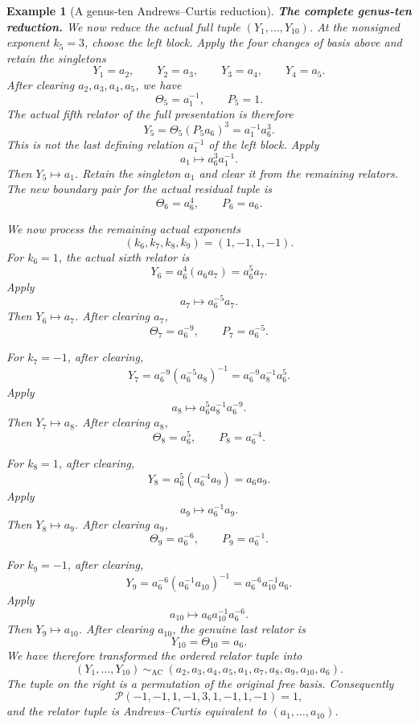 \documentclass{article}
\newtheorem{example}[theorem]{Example}
\begin{document}
\begin{example}[A genus-ten Andrews--Curtis reduction]
\medskip
\noindent\textbf{The complete genus-ten reduction.}
We now reduce the actual full tuple $(Y_1,\ldots,Y_{10})$.  At the
nonsigned exponent $k_5=3$, choose the left block.  Apply the four changes
of basis above and retain the singletons
\[
 Y_1=a_2,
 \qquad
 Y_2=a_3,
 \qquad
 Y_3=a_4,
 \qquad
 Y_4=a_5.
\]
After clearing $a_2,a_3,a_4,a_5$, we have
\[
 \Theta_5=a_1^{-1},
 \qquad
 P_5=1.
\]
The actual fifth relator of the full presentation is therefore
\[
 Y_5=\Theta_5(P_5a_6)^3=a_1^{-1}a_6^3.
\]
This is not the last defining relation $a_1^{-1}$ of the left block.
Apply
\[
 a_1\longmapsto a_6^3a_1^{-1}.
\]
Then $Y_5\mapsto a_1$.  Retain the singleton $a_1$ and clear it from
the remaining relators.  The new boundary pair for the actual residual
tuple is
\[
 \boxed{\Theta_6=a_6^4,\qquad P_6=a_6.}
\]

We now process the remaining actual exponents
\[
 (k_6,k_7,k_8,k_9)=(1,-1,1,-1).
\]
For $k_6=1$, the actual sixth relator is
\[
 Y_6=a_6^4(a_6a_7)=a_6^5a_7.
\]
Apply
\[
 a_7\longmapsto a_6^{-5}a_7.
\]
Then $Y_6\mapsto a_7$.  After clearing $a_7$,
\[
 \Theta_7=a_6^{-9},
 \qquad
 P_7=a_6^{-5}.
\]

For $k_7=-1$, after clearing,
\[
 Y_7=a_6^{-9}(a_6^{-5}a_8)^{-1}
     =a_6^{-9}a_8^{-1}a_6^5.
\]
Apply
\[
 a_8\longmapsto a_6^5a_8^{-1}a_6^{-9}.
\]
Then $Y_7\mapsto a_8$.  After clearing $a_8$,
\[
 \Theta_8=a_6^5,
 \qquad
 P_8=a_6^{-4}.
\]

For $k_8=1$, after clearing,
\[
 Y_8=a_6^5(a_6^{-4}a_9)=a_6a_9.
\]
Apply
\[
 a_9\longmapsto a_6^{-1}a_9.
\]
Then $Y_8\mapsto a_9$.  After clearing $a_9$,
\[
 \Theta_9=a_6^{-6},
 \qquad
 P_9=a_6^{-1}.
\]

For $k_9=-1$, after clearing,
\[
 Y_9=a_6^{-6}(a_6^{-1}a_{10})^{-1}
     =a_6^{-6}a_{10}^{-1}a_6.
\]
Apply
\[
 a_{10}\longmapsto a_6a_{10}^{-1}a_6^{-6}.
\]
Then $Y_9\mapsto a_{10}$.  After clearing $a_{10}$, the genuine last
relator is
\[
 \boxed{Y_{10}=\Theta_{10}=a_6.}
\]
We have therefore transformed the ordered relator tuple into
\[
 \boxed{
 (Y_1,\ldots,Y_{10})
 \ \sim_{\mathrm{AC}}\
 (a_2,a_3,a_4,a_5,a_1,a_7,a_8,a_9,a_{10},a_6).
 }
\]
The tuple on the right is a permutation of the original free basis.
Consequently
\[
 \boxed{
 \mathcal P(-1,-1,1,-1,3,1,-1,1,-1)=1,
 }
\]
and the relator tuple is Andrews--Curtis equivalent to
$(a_1,\ldots,a_{10})$.


\end{example}
\end{document}
